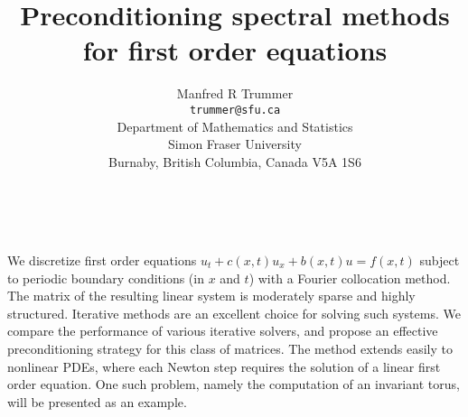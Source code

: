 \documentclass[11pt]{article}
\date{ ~ \hspace{-4mm}}
\title{Preconditioning spectral methods for first order equations  }
\author{Manfred R Trummer \\ {\tt  trummer@sfu.ca} \\ Department of Mathematics and Statistics  \\  Simon Fraser University  \\  Burnaby, British Columbia, Canada V5A 1S6  \\}
\begin{document}
\maketitle
\thispagestyle{empty}





 



We discretize first order equations
$u_t + c(x,t) u_x + b(x,t) u = f(x,t)$
subject to periodic boundary conditions 
(in $x$ and $t$)
with a Fourier collocation method.
The matrix of the resulting linear system
is moderately sparse and highly structured.
Iterative methods are an excellent choice for solving
such systems.  We compare the
performance of various iterative solvers,
and propose an effective preconditioning strategy
for this class of matrices.  The method extends
easily to nonlinear PDEs, where each Newton step
requires the solution of a linear first order
equation.  One such problem, namely the computation of
an invariant torus, will be presented as an example.
\end{document}
